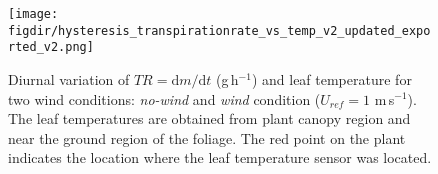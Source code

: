 	\begin{figure}[t]
	\centering
	\texttt{[image: \\figdir/hysteresis\_transpirationrate\_vs\_temp\_v2\_updated\_exported\_v2.png]}
	\caption{Diurnal variation of $TR=\mathrm{d}m/\mathrm{d}t$ (g\,h$^{-1}$) and leaf temperature for two wind conditions:   \textit{no-wind} and   \textit{wind} condition ($U_{ref}=1$ m\,s$^{-1}$).  The leaf temperatures are obtained from  plant canopy region and  near the ground region of the foliage. The red point on the plant indicates the location where the leaf temperature sensor was located.}
	\label{fig:hysteresis_transpirationrate_vs_temp_v2}
	\end{figure}

